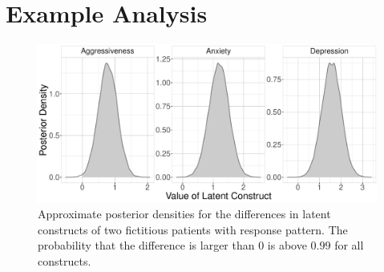 \documentclass[a4paper,usenames,dvipsnames]{article}
\begin{document}



\newpage
\appendix
{}

\section{Example Analysis}

\begin{figure}[!ht]
	\includegraphics[width=\textwidth]{figures/twoPatientsDiffDensity.pdf}
	\caption{Approximate posterior densities for the differences in latent constructs of two fictitious patients with response pattern. The probability that the difference is larger than 0 is above $0.99$ for all constructs.}
	\label{fig:ExamplePosteriorDiff}
\end{figure}
\end{document}

